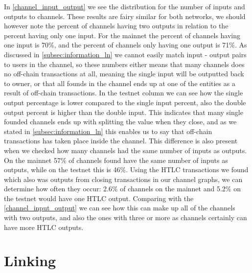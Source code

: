 In \cref{channel_input_output} we see the distribution for the number of inputs and outputs to channels. These results are fairy similar for both networks, we should however note the percent of channels having two outputs in relation to the percent having only one input. For the mainnet the percent of channels having one input is 70\%, and the percent of channels only having one output is 71\%. As discussed in \cref{subsec:information_ln} we cannot easily match input - output pairs to users in the channel, so these numbers either means that many channels does no off-chain transactions at all, meaning the single input will be outputted back to owner, or that all founds in the channel ends up at one of the entities as a result of off-chain transactions. In the testnet column we can see how the single output percentage is lower compared to the single input percent, also the double output percent is higher than the double input. This indicates that many single founded channels ends up with splitting the value when they close, and as we stated in \cref{subsec:information_ln} this enables us to say that off-chain transactions has taken place inside the channel.
This difference is also present when we checked how many channels had the same number of inputs as outputs. On the mainnet 57\% of channels found have the same number of inputs as outputs, while on the testnet this is 46\%. 
Using the HTLC transactions we found which also was outputs from closing transactions in our channel graphs, we can determine how often they occur: 2.6\% of channels on the mainnet and 5.2\% on the testnet would have one HTLC output. Comparing with the \cref{channel_input_output} we can see how this can make up all of the channels with two outputs, and also the ones with three or more as channels certainly can have more HTLC outputs.
\\


\section{Linking}

